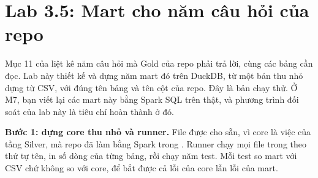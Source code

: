 \section{Lab 3.5: Mart cho năm câu hỏi của repo}

Mục 11 của  liệt kê năm câu hỏi mà Gold của repo phải trả lời, cùng các bảng  cần đọc. Lab này thiết kế và dựng năm mart đó trên DuckDB, từ một bản  thu nhỏ dựng từ CSV, với đúng tên bảng và tên cột của repo. Đây là bản chạy thử. Ở M7, bạn viết lại các mart này bằng Spark SQL trên  thật, và phương trình đối soát của lab này là tiêu chí hoàn thành ở đó.

\textbf{Bước 1: dựng core thu nhỏ và runner.} File  được cho sẵn, vì core là việc của tầng Silver, mà repo đã làm bằng Spark trong . Runner chạy mọi file  trong  theo thứ tự tên, in số dòng của từng bảng, rồi chạy năm test. Mỗi test so mart với CSV chứ không so với core, để bắt được cả lỗi của core lẫn lỗi của mart.


